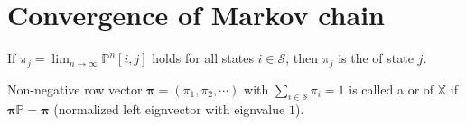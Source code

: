 \section{Convergence of Markov chain}

\begin{definition}
If $ \pi_{j} = \lim_{n \to \infty} \mathbb{P}^{n} [i, j] $ holds for all states $ i \in \mathcal{S} $, then $ \pi_{j} $ is the  of state $ j $.

\begin{comment}
If all states $ i $ have limiting probability, then
\[ \lim_{n \to \infty} \mathbb{P}^{n} [i, j] =
\begin{bmatrix}
  \boldsymbol\pi \\ \vdots \\ \boldsymbol\pi
\end{bmatrix}, \]
where $ \boldsymbol\pi $ is the row vector $ (\pi_{1}, \pi_{2}, \cdots) $.
\end{comment}
\end{definition}

\begin{definition}
Non-negative row vector $ \boldsymbol\pi = (\pi_{1}, \pi_{2}, \cdots) $ with $ \sum_{i \in \mathcal{S}} \pi_{i} = 1 $ is called a  or  of $ \mathbb{X} $ if $ \boldsymbol\pi \mathbb{P} = \boldsymbol\pi $ (normalized left eignvector with eignvalue $ 1 $).

\begin{comment}
Why ``steady-state''?

If $ P(X(0) = i) = \pi_{i} $ for all $ i \in \mathcal{S} $, then
\begin{eqnarray*}
P(X(1) = i)
  & = & \sum_{i \in \mathcal{S}} P(X(1) = j \mid X(0) = i) \cdot P(X(0) = i) \\
  & = & \sum_{i \in \mathcal{S}} \pi_{i} \cdot \mathbb{P}[i, j] \\
  & = & \pi_{j},
\end{eqnarray*}
for all $ j \in \mathcal{S} $.
\end{comment}
\end{definition}

